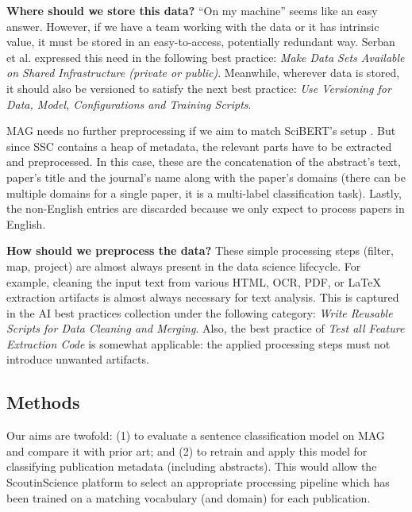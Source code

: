 \begin{displayquote}
\textbf{Where should we store this data?} ``On my machine'' seems like an easy answer. However, if we have a team working with the data or it has intrinsic value, it must be stored in an easy-to-access, potentially redundant way. Serban et al. \cite{serban2020adoption} expressed this need in the following best practice: \textit{Make Data Sets Available on Shared Infrastructure (private or public)}. Meanwhile, wherever data is stored, it should also be versioned to satisfy the next best practice: \textit{Use Versioning for Data, Model, Configurations and Training Scripts}.
\end{displayquote}

MAG needs no further preprocessing if we aim to match SciBERT's setup \cite{beltagy2019scibert}. But since SSC contains a heap of metadata, the relevant parts have to be extracted and preprocessed. In this case, these are the concatenation of the abstract's text, paper's title and the journal's name along with the paper's domains (there can be multiple domains for a single paper, it is a multi-label classification task). Lastly, the non-English entries are discarded because we only expect to process papers in  English.

\begin{displayquote}
\textbf{How should we preprocess the data?} These simple processing steps (filter, map, project) are almost always present in the data science lifecycle. For example, cleaning the input text from various HTML, OCR, PDF, or \LaTeX \hskip 0.12cm extraction artifacts is almost always necessary for text analysis. This is captured in the AI best practices collection under the following category: \textit{Write Reusable Scripts for Data Cleaning and Merging}. Also, the best practice of \textit{Test all Feature Extraction Code} is somewhat applicable: the applied processing steps must not introduce unwanted artifacts.
\end{displayquote}

\subsection{Methods}

Our aims are twofold: (1) to evaluate a sentence classification model on MAG and compare it with prior art; and (2) to retrain and apply this model for classifying publication metadata (including abstracts). This would allow the ScoutinScience platform to select an appropriate processing pipeline which has been trained on a matching vocabulary (and domain) for each publication. 

